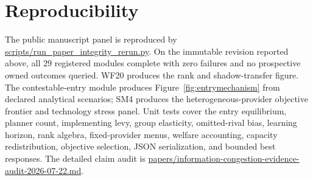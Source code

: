 \documentclass[sigconf,nonacm]{acmart}
\newcommand{\1}{\mathbf 1}
\begin{document}
\section{Reproducibility}

The public manuscript panel is reproduced by
\url{scripts/run_paper_integrity_rerun.py}.  On the immutable revision
reported above, all 29 registered modules complete with zero failures and no
prospective owned outcomes queried.  WF20 produces the rank and shadow-transfer
figure.  The contestable-entry module produces Figure~\ref{fig:entrymechanism}
from declared analytical scenarios; SM4 produces the heterogeneous-provider
objective frontier and technology stress panel.  Unit tests cover the entry
equilibrium, planner count, implementing levy, group elasticity, omitted-rival
bias, learning horizon, rank algebra, fixed-provider menus, welfare accounting,
capacity redistribution, objective selection, JSON serialization, and bounded
best responses.  The detailed claim audit is
\url{papers/information-congestion-evidence-audit-2026-07-22.md}.



\end{document}
